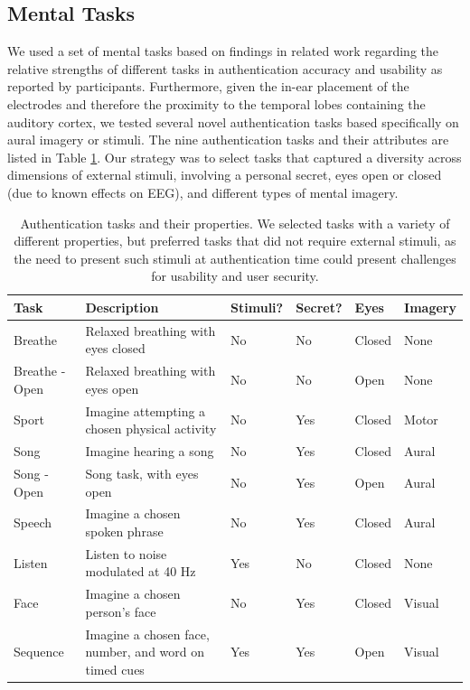 \documentclass{sigchi}
\begin{document}
\subsection{Mental Tasks}

We used a set of mental tasks based on findings in related work regarding the relative strengths of different tasks in authentication accuracy and usability as reported by participants. \cite{Chuang2013b, curran2016passthoughts} Furthermore, given the in-ear placement of the electrodes and therefore the proximity to the temporal lobes containing the auditory cortex, we tested several novel authentication tasks based specifically on aural imagery or stimuli. The nine authentication tasks and their attributes are listed in Table \ref{tab:tasks}. Our strategy was to select tasks that captured a diversity across dimensions of external stimuli, involving a personal secret, eyes open or closed (due to known effects on EEG), and different types of mental imagery.

\begin{table}[t]
\centering
\begin{tabularx}{\textwidth}{llllll}

\textbf{Task} & \textbf{Description} & \textbf{Stimuli}? & \textbf{Secret}? & \textbf{Eyes} & \textbf{Imagery}\\
\hline
Breathe & Relaxed breathing with eyes closed & No & No & Closed & None\\
Breathe - Open & Relaxed breathing with eyes open & No & No & Open & None\\
Sport & Imagine attempting a chosen physical activity & No & Yes & Closed & Motor\\
Song & Imagine hearing a song & No & Yes & Closed & Aural\\
Song - Open & Song task, with eyes open & No & Yes & Open & Aural\\
Speech & Imagine a chosen spoken phrase & No & Yes & Closed & Aural\\
Listen & Listen to noise modulated at 40 Hz & Yes & No & Closed & None\\
Face & Imagine a chosen person's face & No & Yes & Closed & Visual\\
Sequence & Imagine a chosen face, number, and word on timed cues & Yes & Yes & Open & Visual\\
\hline
\end{tabularx}
\caption{Authentication tasks and their properties. We selected tasks with a variety of different properties, but preferred tasks that did not require external stimuli, as the need to present such stimuli at authentication time could present challenges for usability and user security.}
\label{tab:tasks}%
\end{table}
\end{document}
